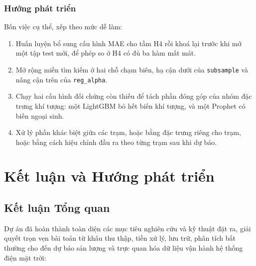 \documentclass[12pt, a4paper]{report}
\begin{document}
\subsection{Hướng phát triển}

Bốn việc cụ thể, xếp theo mức dễ làm:

\begin{enumerate}
    \item Huấn luyện bổ sung cấu hình MAE cho tầm H4 rồi khoá lại trước khi mở một tập test
    mới, để phép so ở H4 có đủ ba hàm mất mát.
    \item Mở rộng miền tìm kiếm ở hai chỗ chạm biên, hạ cận dưới của \texttt{subsample} và
    nâng cận trên của \texttt{reg\_alpha}.
    \item Chạy hai cấu hình đối chứng còn thiếu để tách phần đóng góp của nhóm đặc trưng khí
    tượng: một LightGBM bỏ hết biến khí tượng, và một Prophet có biến ngoại sinh.
    \item Xử lý phần khác biệt giữa các trạm, hoặc bằng đặc trưng riêng cho trạm, hoặc bằng
    cách hiệu chỉnh đầu ra theo từng trạm sau khi dự báo.
\end{enumerate}


\setcounter{topnumber}{2}
\setcounter{bottomnumber}{1}
\setcounter{totalnumber}{3}
\renewcommand{\topfraction}{0.7}
\renewcommand{\bottomfraction}{0.3}
\renewcommand{\textfraction}{0.2}
\renewcommand{\floatpagefraction}{0.5}

\newpage

\setcounter{topnumber}{2}
\setcounter{bottomnumber}{1}
\setcounter{totalnumber}{3}
\renewcommand{\topfraction}{0.7}
\renewcommand{\bottomfraction}{0.3}
\renewcommand{\textfraction}{0.2}
\renewcommand{\floatpagefraction}{0.5}

\newpage
\chapter{Kết luận và Hướng phát triển}
\label{chap:conclusion}

\section{Kết luận Tổng quan}
\label{sec:conclusion}
Dự án đã hoàn thành toàn diện các mục tiêu nghiên cứu và kỹ thuật đặt ra, giải quyết trọn vẹn bài toán từ khâu thu thập, tiền xử lý, lưu trữ, phân tích bất thường cho đến dự báo sản lượng và trực quan hóa dữ liệu vận hành hệ thống điện mặt trời:
\end{document}
